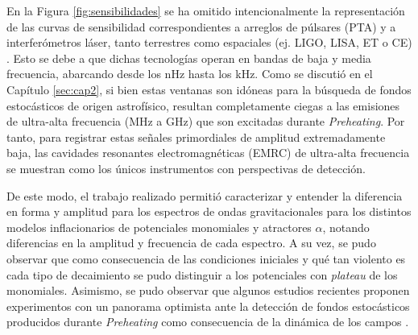 En la Figura \ref{fig:sensibilidades} se ha omitido intencionalmente la representación de las curvas de sensibilidad correspondientes a arreglos de púlsares (PTA) \cite{NANOGrav} y a interferómetros láser, tanto terrestres como espaciales (ej. LIGO, LISA, ET o CE) \cite{Caprini_2020, Renzini2022}. Esto se debe a que dichas tecnologías operan en bandas de baja y media frecuencia, abarcando desde los nHz hasta los kHz. Como se discutió en el Capítulo \ref{sec:cap2}, si bien estas ventanas son idóneas para la búsqueda de fondos estocásticos de origen astrofísico, resultan completamente ciegas a las emisiones de ultra-alta frecuencia (MHz a GHz) que son excitadas durante \textit{Preheating}. Por tanto, para registrar estas señales primordiales de amplitud extremadamente baja, las cavidades resonantes electromagnéticas (EMRC) de ultra-alta frecuencia \cite{Domcke_2023, Berlin_2023, Herman_2023} se muestran como los únicos instrumentos con perspectivas de detección.

De este modo, el trabajo realizado permitió caracterizar y entender la diferencia en forma y amplitud para los espectros de ondas gravitacionales para los distintos modelos inflacionarios de potenciales monomiales y atractores $\alpha$, notando diferencias en la amplitud y frecuencia de cada espectro. A su vez, se pudo observar que como consecuencia de las condiciones iniciales y qué tan violento es cada tipo de decaimiento se pudo distinguir a los potenciales con \textit{plateau} de los monomiales. Asimismo, se pudo observar que algunos estudios recientes proponen experimentos con un panorama optimista ante la detección de fondos estocásticos producidos durante \textit{Preheating} como consecuencia de la dinámica de los campos \cite{Mohanty_2026,Herman_2023,Ringwald_2022,Gross_2025,Gatti_2024}.